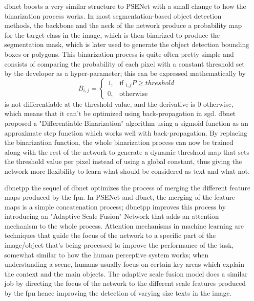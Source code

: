 \gls{dbnet} \cite{liao_real-time_2019} boosts a very similar structure to PSENet with a small change to how the binarization process works. In most segmentation-based object detection methods, the backbone and the neck of the network produce a probability map for the target class in the image, which is then binarized to produce the segmentation mask, which is later used to generate the object detection bounding boxes or polygons. This binarization process is quite often pretty simple and consists of comparing the probability of each pixel with a constant threshold set by the developer as a hyper-parameter; this can be expressed mathematically by
\begin{equation}
    B_{i,j} = 
    \begin{cases}
        1,& \text{if }_{i,j} P\geq threshold\\
        0,              & \text{otherwise}
    \end{cases}
\end{equation}
is not differentiable at the threshold value, and the derivative is $0$ otherwise, which means that it can't be optimized using back-propagation in \gls{sgd}. \gls{dbnet} proposed a "Differentiable Binarization" algorithm using a sigmoid function as an approximate step function which works well with back-propagation. By replacing the binarization function, the whole binarization process can now be trained along with the rest of the network to generate a dynamic threshold map that sets the threshold value per pixel instead of using a global constant, thus giving the network more flexibility to learn what should be considered as text and what not.

\gls{dbnetpp} \cite{liao_real-time_2023} the sequel of \gls{dbnet} optimizes the process of merging the different feature maps produced by the \gls{fpn}. In PSENet and \gls{dbnet}, the merging of the feature maps is a simple concatenation process; \gls{dbnetpp} improves this process by introducing an "Adaptive Scale Fusion" Network that adds an attention mechanism to the whole process. Attention mechanisms in machine learning are techniques that guide the focus of the network to a specific part of the image/object that's being processed to improve the performance of the task, somewhat similar to how the human perceptive system works; when understanding a scene, humans usually focus on certain key areas which explain the context and the main objects. The adaptive scale fusion model does a similar job by directing the focus of the network to the different scale features produced by the \gls{fpn} hence improving the detection of varying size texts in the image.

